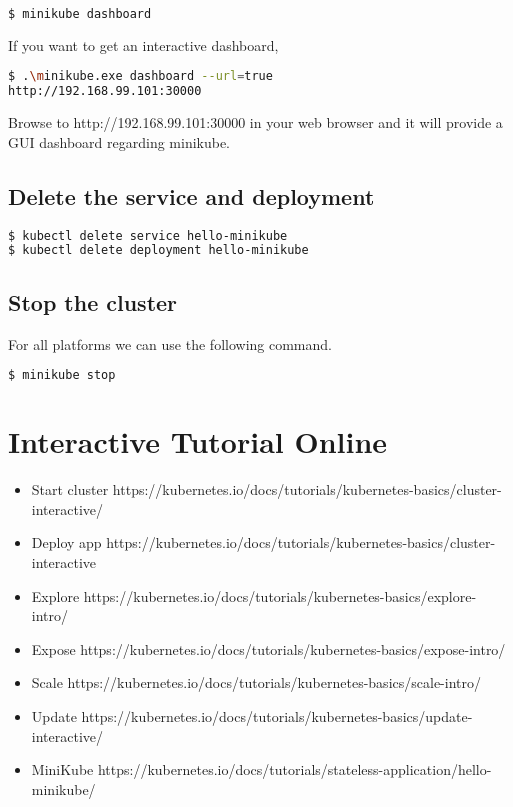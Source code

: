 \begin{lstlisting}[language=bash]
$ minikube dashboard
\end{lstlisting}

If you want to get an interactive dashboard,

\begin{lstlisting}[language=bash]
$ .\minikube.exe dashboard --url=true
http://192.168.99.101:30000
\end{lstlisting}

Browse to http://192.168.99.101:30000 in your web browser and it will
provide a GUI dashboard regarding minikube.

\subsection{Delete the service and deployment}

\begin{lstlisting}[language=bash]
$ kubectl delete service hello-minikube
$ kubectl delete deployment hello-minikube
\end{lstlisting}

\subsection{Stop the cluster}

For all platforms we can use the following command.

\begin{lstlisting}[language=bash]
$ minikube stop
\end{lstlisting}

\section{Interactive Tutorial Online}

\begin{itemize}

\item
  Start cluster
  https://kubernetes.io/docs/tutorials/kubernetes-basics/cluster-interactive/
\item
  Deploy app
  https://kubernetes.io/docs/tutorials/kubernetes-basics/cluster-interactive
\item
  Explore
  https://kubernetes.io/docs/tutorials/kubernetes-basics/explore-intro/
\item
  Expose
  https://kubernetes.io/docs/tutorials/kubernetes-basics/expose-intro/
\item
  Scale
  https://kubernetes.io/docs/tutorials/kubernetes-basics/scale-intro/
\item
  Update
  https://kubernetes.io/docs/tutorials/kubernetes-basics/update-interactive/
\item
  MiniKube
  https://kubernetes.io/docs/tutorials/stateless-application/hello-minikube/
\end{itemize}
